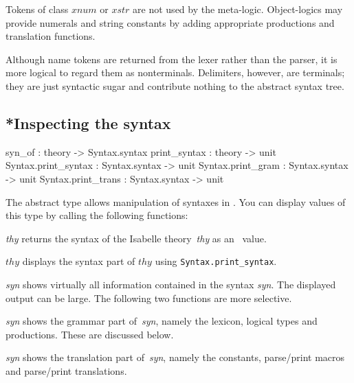 Tokens of class $xnum$ or $xstr$ are not used by the meta-logic.
Object-logics may provide numerals and string constants by adding appropriate
productions and translation functions.

\medskip
Although name tokens are returned from the lexer rather than the parser, it
is more logical to regard them as nonterminals.  Delimiters, however, are
terminals; they are just syntactic sugar and contribute nothing to the
abstract syntax tree.


\subsection{*Inspecting the syntax} \label{pg:print_syn}
\begin{ttbox}
syn_of              : theory -> Syntax.syntax
print_syntax        : theory -> unit
Syntax.print_syntax : Syntax.syntax -> unit
Syntax.print_gram   : Syntax.syntax -> unit
Syntax.print_trans  : Syntax.syntax -> unit
\end{ttbox}
The abstract type  allows manipulation of syntaxes
in \ML.  You can display values of this type by calling the following
functions:
\begin{ttdescription}
\item[\ttindexbold{syn_of} {\it thy}] returns the syntax of the Isabelle
  theory~{\it thy} as an \ML\ value.

\item[\ttindexbold{print_syntax} $thy$] displays the syntax part of $thy$
  using {\tt Syntax.print_syntax}.

\item[\ttindexbold{Syntax.print_syntax} {\it syn}] shows virtually all
  information contained in the syntax {\it syn}.  The displayed output can
  be large.  The following two functions are more selective.

\item[\ttindexbold{Syntax.print_gram} {\it syn}] shows the grammar part
  of~{\it syn}, namely the lexicon, logical types and productions.  These are
  discussed below.

\item[\ttindexbold{Syntax.print_trans} {\it syn}] shows the translation
  part of~{\it syn}, namely the constants, parse/print macros and
  parse/print translations.
\end{ttdescription}

